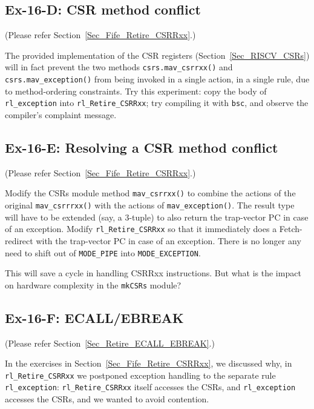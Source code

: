 \subsection*{Ex-16-D: CSR method conflict}
\label{Ex-16-D-CSR-Method-Conflict}

(Please refer Section~\ref{Sec_Fife_Retire_CSRRxx}.)

The provided implementation of the CSR registers
(Section~\ref{Sec_RISCV_CSRs}) will in fact prevent the two methods
\verb|csrs.mav_csrrxx()| and \verb|csrs.mav_exception()| from being
invoked in a single action, {\ie} in a single rule, due to
method-ordering constraints.  Try this experiment: copy the body of
\verb|rl_exception| into \verb|rl_Retire_CSRRxx|; try compiling it
with \verb|bsc|, and observe the compiler's complaint message.


\subsection*{Ex-16-E: Resolving a CSR method conflict}
\label{Ex-16-E-Resolving-a-CSR-Method-Conflict}

(Please refer Section~\ref{Sec_Fife_Retire_CSRRxx}.)

Modify the CSRs module method \verb|mav_csrrxx()| to combine the
actions of the original \verb|mav_csrrrxx()| with the actions of
\verb|mav_exception()|.  The result type will have to be extended
(say, a 3-tuple) to also return the trap-vector PC in case of an
exception.  Modify \verb|rl_Retire_CSRRxx| so that it immediately does
a Fetch-redirect with the trap-vector PC in case of an exception.
There is no longer any need to shift out of \verb|MODE_PIPE| into
\verb|MODE_EXCEPTION|.

This will save a cycle in handling CSRRxx instructions.  But what is
the impact on hardware complexity in the \verb|mkCSRs| module?


\subsection*{Ex-16-F: ECALL/EBREAK}
\label{Ex-16-F-ECALL-EBREAK}

(Please refer Section~\ref{Sec_Retire_ECALL_EBREAK}.)

In the exercises in Section~\ref{Sec_Fife_Retire_CSRRxx}, we discussed
why, in \verb|rl_Retire_CSRRxx| we postponed exception handling to the
separate rule \verb|rl_exception|: \verb|rl_Retire_CSRRxx| itself
accesses the CSRs, and \verb|rl_exception| accesses the CSRs, and we
wanted to avoid contention.

